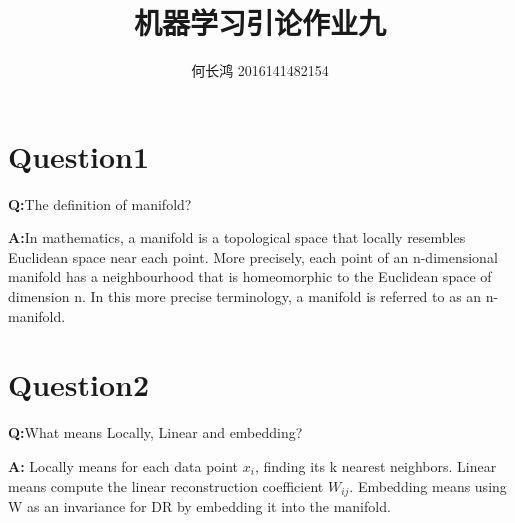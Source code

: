 \documentclass{xcumcmart}
\title{机器学习引论作业九}
\author{何长鸿 2016141482154}
\begin{document}
\renewcommand\arraystretch{2}
\maketitle
\section{Question1}
\textbf{Q:}The definition of manifold?\\
\par \textbf{A:}In mathematics, a manifold is a topological space that locally resembles Euclidean space near each point. More precisely, each point of an n-dimensional manifold has a neighbourhood that is homeomorphic to the Euclidean space of dimension n. In this more precise terminology, a manifold is referred to as an n-manifold. 

\section{Question2}
\textbf{Q:}What means Locally, Linear and embedding?\\
\par \textbf{A:} Locally means for each data point $x_i$, finding its k nearest neighbors. Linear means compute the linear reconstruction coefficient $W_{ij}$. Embedding means using W as an invariance for DR by embedding it into the manifold.
\end{document}
